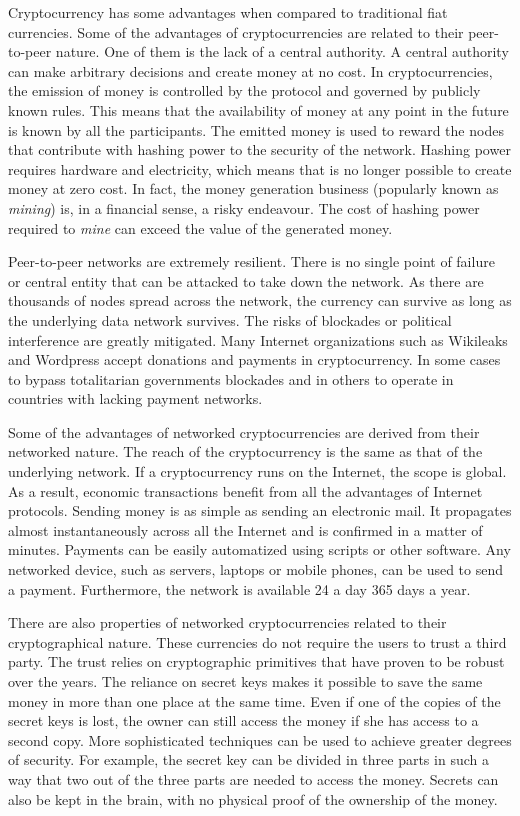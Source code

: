 \documentclass[journal]{IEEEtran}
\begin{document}
Cryptocurrency has some advantages when compared to traditional fiat currencies.
Some of the advantages of cryptocurrencies are related to their peer-to-peer nature.
One of them is the lack of a central authority.
A central authority can make arbitrary decisions and create money at no cost.
In cryptocurrencies, the emission of money is controlled by the protocol and governed by publicly known rules.
This means that the availability of money at any point in the future is known by all the participants.
The emitted money is used to reward the nodes that contribute with hashing power to the security of the network.
Hashing power requires hardware and electricity, which means that is no longer possible to create money at zero cost.
In fact, the money generation business (popularly known as \emph{mining}) is, in a financial sense, a risky endeavour.
The cost of hashing power required to \emph{mine} can exceed the value of the generated money.

Peer-to-peer networks are extremely resilient.
There is no single point of failure or central entity that can be attacked to take down the network.
As there are thousands of nodes spread across the network, the currency can survive as long as the underlying data network survives.
The risks of blockades or political interference are greatly mitigated.
Many Internet organizations such as Wikileaks and Wordpress accept donations and payments in cryptocurrency.
In some cases to bypass totalitarian governments blockades and in others to operate in countries with lacking payment networks.

Some of the advantages of networked cryptocurrencies are derived from their networked nature.
The reach of the cryptocurrency is the same as that of the underlying network.
If a cryptocurrency runs on the Internet, the scope is global.
As a result, economic transactions benefit from all the advantages of Internet protocols.
Sending money is as simple as sending an electronic mail.
It propagates almost instantaneously across all the Internet and is confirmed in a matter of minutes.
Payments can be easily automatized using scripts or other software.
Any networked device, such as servers, laptops or mobile phones, can be used to send a payment.
Furthermore, the network is available 24 a day 365 days a year.

There are also properties of networked cryptocurrencies related to their cryptographical nature.
These currencies do not require the users to trust a third party.
The trust relies on cryptographic primitives that have proven to be robust over the years.
The reliance on secret keys makes it possible to save the same money in more than one place at the same time.
Even if one of the copies of the secret keys is lost, the owner can still access the money if she has access to a second copy.
More sophisticated techniques can be used to achieve greater degrees of security. 
For example, the secret key can be divided in three parts in such a way that two out of the three parts are needed to access the money.
Secrets can also be kept in the brain, with no physical proof of the ownership of the money.
\end{document}
